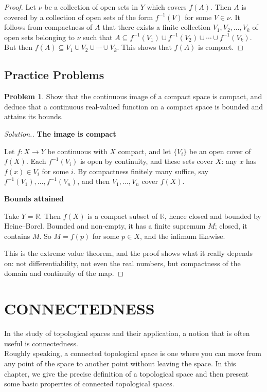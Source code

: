 \documentclass[11pt,a4paper]{article}
\theoremstyle{definition}
\newtheorem{problemx}{Problem}[subsection]
\newenvironment{problem}{\begin{problemx}}{\end{problemx}}
\newenvironment{solution}
  {\renewcommand{\qedsymbol}{}\begin{proof}[\textit{Solution}.]}
  {\end{proof}}
\newcommand{\subhead}[1]{%
  \par\medskip\noindent\textbf{#1}\par\nobreak\smallskip}
\begin{document}
\begin{proof}
Let $\nu$ be a collection of open sets in $Y$ which covers $f(A)$. Then $A$ is covered by a collection of open sets of the form $f^{-1}(V)$ for some $V\in \nu$. It follows from compactness of $A$ that there exists a finite collection $V_1,V_2,\ldots,V_k$ of open sets belonging to $\nu$ such that $A\subseteq f^{-1}(V_1)\cup f^{-1}(V_2)\cup\cdots\cup f^{-1}(V_k)$. But then $f(A)\subseteq V_1\cup V_2\cup\cdots\cup V_k$. This shows that $f(A)$ is compact.
\end{proof}


\subsection{Practice Problems}

\begin{problem}
Show that the continuous image of a compact space is compact, and deduce that a
continuous real-valued function on a compact space is bounded and attains its
bounds.
\end{problem}
\begin{solution}
\subhead{The image is compact}
Let $f:X\rightarrow Y$ be continuous with $X$ compact, and let $\{V_i\}$ be an
open cover of $f(X)$. Each $f^{-1}(V_i)$ is open by continuity, and these sets
cover $X$: any $x$ has $f(x)\in V_i$ for some $i$. By compactness finitely many
suffice, say $f^{-1}(V_1),\dots,f^{-1}(V_n)$, and then $V_1,\dots,V_n$ cover
$f(X)$.

\subhead{Bounds attained}
Take $Y=\mathbb{R}$. Then $f(X)$ is a compact subset of $\mathbb{R}$, hence
closed and bounded by Heine--Borel. Bounded and non-empty, it has a finite
supremum $M$; closed, it contains $M$. So $M=f(p)$ for some $p\in X$, and the
infimum likewise.

This is the extreme value theorem, and the proof shows what it really depends
on: not differentiability, not even the real numbers, but compactness of the
domain and continuity of the map.
\end{solution}


\section{CONNECTEDNESS}
In the study of topological spaces and their application, a notion that is often useful is connectedness.\\ 
Roughly speaking, a connected topological space is one where you can move from any point of the space to another point without leaving the space. In this chapter, we give the precise definition of a topological space and then present some basic properties of connected topological spaces.
\end{document}
